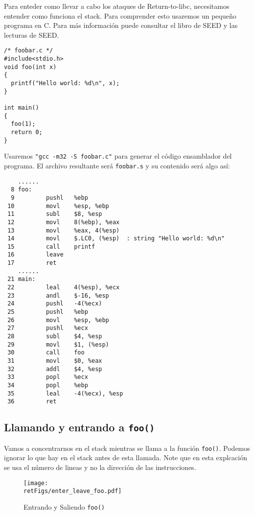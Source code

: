 Para enteder como llevar a cabo los ataques de Return-to-libc, necesitamos entender como funciona el stack. Para comprender esto usaremos un pequeño programa en C. Para más información puede consultar el libro de SEED y las lecturas de SEED.


\begin{lstlisting}
/* foobar.c */
#include<stdio.h>
void foo(int x)
{
  printf("Hello world: %d\n", x);
}

int main()
{
  foo(1);
  return 0;
}
\end{lstlisting}

Usaremos {\tt "gcc -m32 -S foobar.c"}  para generar el código ensamblador del programa.
El archivo resultante será {\tt foobar.s} y su contenido será algo así:


\begin{lstlisting}
    ......
  8 foo:
  9         pushl   %ebp
 10         movl    %esp, %ebp
 11         subl    $8, %esp
 12         movl    8(%ebp), %eax   
 13         movl    %eax, 4(%esp)
 14         movl    $.LC0, (%esp)  : string "Hello world: %d\n"
 15         call    printf
 16         leave
 17         ret
    ......
 21 main:
 22         leal    4(%esp), %ecx
 23         andl    $-16, %esp
 24         pushl   -4(%ecx)
 25         pushl   %ebp
 26         movl    %esp, %ebp
 27         pushl   %ecx
 28         subl    $4, %esp
 29         movl    $1, (%esp)
 30         call    foo
 31         movl    $0, %eax
 32         addl    $4, %esp
 33         popl    %ecx
 34         popl    %ebp
 35         leal    -4(%ecx), %esp
 36         ret
\end{lstlisting}
 


\subsection{Llamando y entrando a {\tt foo()}}

Vamos a concentrarnos en el stack mientras se llama a la función {\tt foo()}. Podemos ignorar lo que hay en el stack antes de esta llamada. Note que en esta explcación se usa el número de lineas y no la dirección de las instrucciones.



\begin{figure}[htb]
	\centering
	\texttt{[image: \\retFigs/enter\_leave\_foo.pdf]}
	\caption{Entrando y Saliendo {\tt foo()}}
	\label{fig:enter_leave_foo}
\end{figure}


